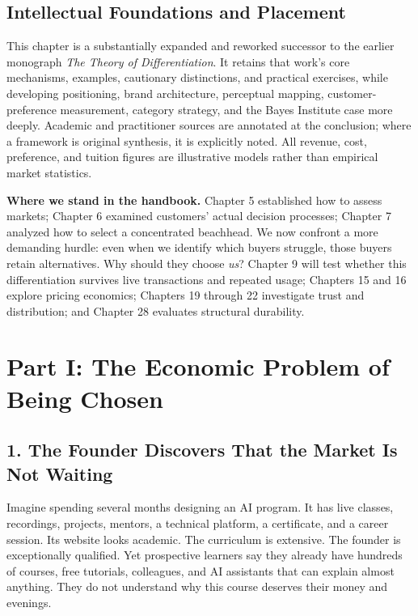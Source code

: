 \subsection*{Intellectual Foundations and Placement}

This chapter is a substantially expanded and reworked successor to the earlier monograph \emph{The Theory of Differentiation}. It retains that work's core mechanisms, examples, cautionary distinctions, and practical exercises, while developing positioning, brand architecture, perceptual mapping, customer-preference measurement, category strategy, and the Bayes Institute case more deeply. Academic and practitioner sources are annotated at the conclusion; where a framework is original synthesis, it is explicitly noted. All revenue, cost, preference, and tuition figures are illustrative models rather than empirical market statistics.

\textbf{Where we stand in the handbook.} Chapter 5 established how to assess markets; Chapter 6 examined customers' actual decision processes; Chapter 7 analyzed how to select a concentrated beachhead. We now confront a more demanding hurdle: even when we identify which buyers struggle, those buyers retain alternatives. Why should they choose \emph{us}? Chapter 9 will test whether this differentiation survives live transactions and repeated usage; Chapters 15 and 16 explore pricing economics; Chapters 19 through 22 investigate trust and distribution; and Chapter 28 evaluates structural durability.

\section*{Part I: The Economic Problem of Being Chosen}

\subsection*{1. The Founder Discovers That the Market Is Not Waiting}

Imagine spending several months designing an AI program. It has live classes, recordings, projects, mentors, a technical platform, a certificate, and a career session. Its website looks academic. The curriculum is extensive. The founder is exceptionally qualified. Yet prospective learners say they already have hundreds of courses, free tutorials, colleagues, and AI assistants that can explain almost anything. They do not understand why this course deserves their money and evenings.

